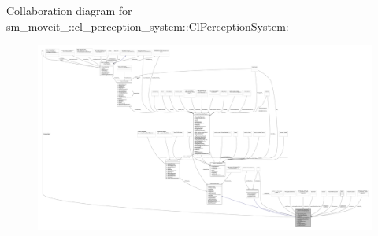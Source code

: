 Collaboration diagram for sm\+\_\+moveit\+\_\+:\+:cl\+\_\+perception\+\_\+system\+:\+:Cl\+Perception\+System\+:
\nopagebreak
\begin{figure}[H]
\begin{center}
\leavevmode
\includegraphics[width=350pt]{classsm__moveit__4_1_1cl__perception__system_1_1ClPerceptionSystem__coll__graph}
\end{center}
\end{figure}
